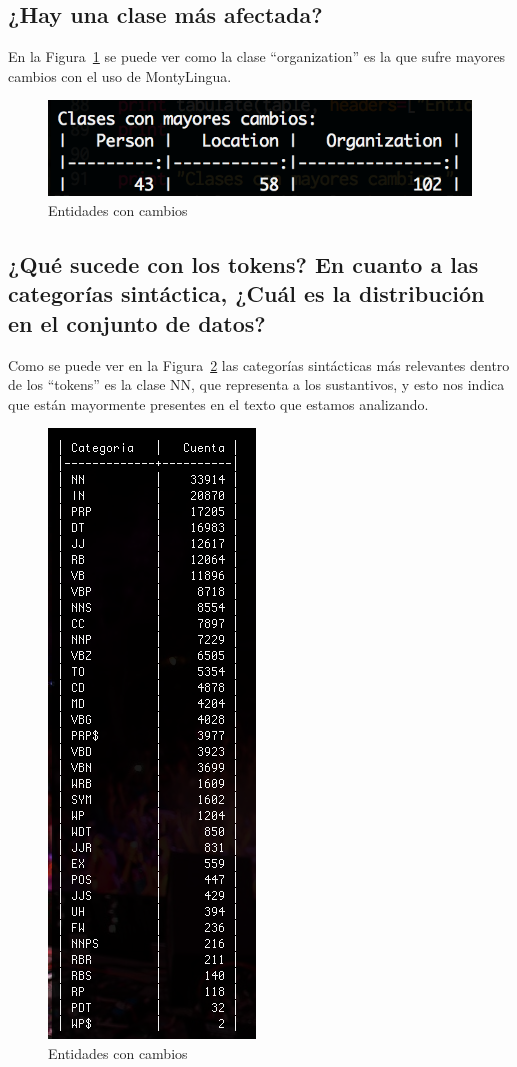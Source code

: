 \documentclass{article}
\begin{document}
\subsection{¿Hay una clase más afectada?}
En la Figura~\ref{fig:cambios} se puede ver como la clase ``organization'' es la que sufre mayores cambios con el uso de MontyLingua.
\begin{figure}[h!]
\centering
\includegraphics[scale=0.5]{figuras/cambios.png}
\caption{Entidades con cambios}
\label{fig:cambios}
\end{figure}
\subsection{¿Qué sucede con los tokens? En cuanto a las categorías sintáctica, ¿Cuál es la distribución en el conjunto de datos?}
Como se puede ver en la Figura~\ref{fig:sint_cat} las categorías sintácticas más relevantes dentro de los ``tokens'' es la clase NN, que representa a los sustantivos, y esto nos indica que están mayormente presentes en el texto que estamos analizando.
\begin{figure}[h!]
\centering
\includegraphics[scale=0.5]{figuras/sint_cat.png}
\caption{Entidades con cambios}
\label{fig:sint_cat}
\end{figure}
\end{document}
